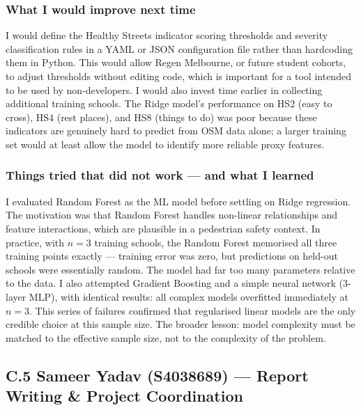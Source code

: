 \documentclass[11pt,a4paper]{article}
\begin{document}
\subsubsection*{What I would improve next time}
I would define the Healthy Streets indicator scoring thresholds and severity classification rules in a YAML or JSON configuration file rather than hardcoding them in Python. This would allow Regen Melbourne, or future student cohorts, to adjust thresholds without editing code, which is important for a tool intended to be used by non-developers. I would also invest time earlier in collecting additional training schools. The Ridge model's performance on HS2 (easy to cross), HS4 (rest places), and HS8 (things to do) was poor because these indicators are genuinely hard to predict from OSM data alone; a larger training set would at least allow the model to identify more reliable proxy features.

\subsubsection*{Things tried that did not work — and what I learned}
I evaluated Random Forest as the ML model before settling on Ridge regression. The motivation was that Random Forest handles non-linear relationships and feature interactions, which are plausible in a pedestrian safety context. In practice, with $n=3$ training schools, the Random Forest memorised all three training points exactly — training error was zero, but predictions on held-out schools were essentially random. The model had far too many parameters relative to the data. I also attempted Gradient Boosting and a simple neural network (3-layer MLP), with identical results: all complex models overfitted immediately at $n=3$. This series of failures confirmed that regularised linear models are the only credible choice at this sample size. The broader lesson: model complexity must be matched to the effective sample size, not to the complexity of the problem.

\bigskip
\subsection*{C.5 Sameer Yadav (S4038689) — Report Writing \& Project Coordination}
\end{document}
